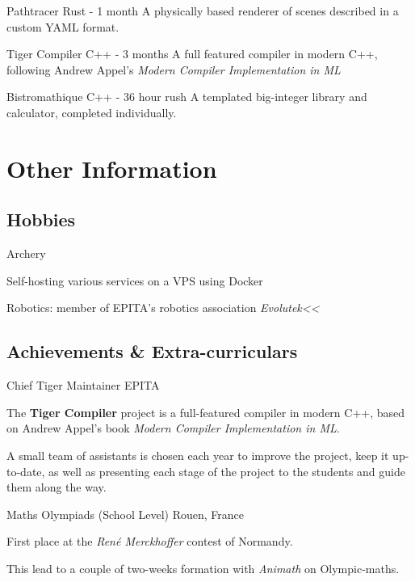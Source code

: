 \documentclass[letterpaper]{twentysecondcv} %
\begin{document}
\begin{twenty}

    {Pathtracer}
    {Rust - 1 month}
    {A physically based renderer of scenes described in a custom YAML format.}

    {Tiger Compiler}
    {C++ - 3 months}
    {A full featured compiler in modern C++, following Andrew Appel's
    \textit{Modern Compiler Implementation in ML}}

    {Bistromathique}
    {C++ - 36 hour rush}
    {A templated big-integer library and calculator, completed individually.}

\end{twenty}



\section{Other Information}

\subsection{Hobbies}

\begin{twenty}

  \twentyitemshort{}
    {Archery}

  \twentyitemshort{}
    {Self-hosting various services on a VPS using Docker}

  \twentyitemshort{}
    {Robotics: member of EPITA's robotics association \textit{Evolutek<<}}

\end{twenty}

\subsection{Achievements \& Extra-curriculars}

\begin{twenty}

    {Chief Tiger Maintainer}
    {EPITA}
    {The \textbf{Tiger Compiler} project is a full-featured compiler in modern
    C++, based on Andrew Appel's book \textit{Modern Compiler Implementation
    in ML}.

    A small team of assistants is chosen each year to improve the project, keep
    it up-to-date, as well as presenting each stage of the project to the
    students and guide them along the way.}

    {Maths Olympiads (School Level)}
    {Rouen, France}
    {First place at the \textit{René Merckhoffer} contest of Normandy.

    This lead to a couple of two-weeks formation with \textit{Animath} on
    Olympic-maths.}

\end{twenty}
\end{document}
